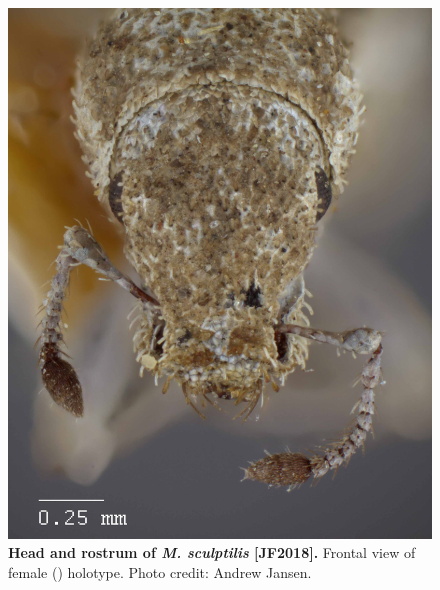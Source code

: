 \documentclass[fleqn,10pt,lineno]{wlpeerj} %
\begin{document}
\begin{figure}[h]
	\centering
	\includegraphics[width=\textwidth]{figure26.jpg}
	\caption{\textbf{Head and rostrum of \textit{M. sculptilis} [JF2018].} Frontal view of female (\female) holotype. Photo credit: Andrew Jansen.}
	\label{fig:sculptilis_F_frontal}
\end{figure}
\end{document}
